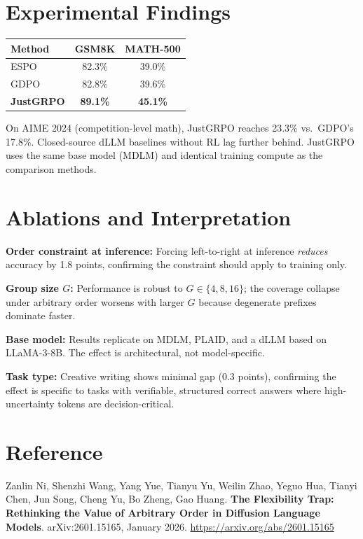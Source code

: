 \documentclass[10pt,twocolumn]{article}
\begin{document}
\section{Experimental Findings}

\begin{center}
\small
\begin{tabular}{lcc}
\toprule
\textbf{Method} & \textbf{GSM8K} & \textbf{MATH-500} \\
\midrule
ESPO   & 82.3\% & 39.0\% \\
GDPO   & 82.8\% & 39.6\% \\
\textbf{JustGRPO} & \textbf{89.1\%} & \textbf{45.1\%} \\
\bottomrule
\end{tabular}
\end{center}

On AIME 2024 (competition-level math), JustGRPO reaches 23.3\%
vs.\ GDPO's 17.8\%. Closed-source dLLM baselines without RL lag further behind.
JustGRPO uses the same base model (MDLM) and identical training compute as the
comparison methods.

\section{Ablations and Interpretation}

\textbf{Order constraint at inference:} Forcing left-to-right at inference
\emph{reduces} accuracy by 1.8 points, confirming the constraint should
apply to training only.

\textbf{Group size $G$:} Performance is robust to $G \in \{4, 8, 16\}$;
the coverage collapse under arbitrary order worsens with larger $G$ because
degenerate prefixes dominate faster.

\textbf{Base model:} Results replicate on MDLM, PLAID, and a dLLM based on
LLaMA-3-8B. The effect is architectural, not model-specific.

\textbf{Task type:} Creative writing shows minimal gap (0.3 points),
confirming the effect is specific to tasks with verifiable, structured
correct answers where high-uncertainty tokens are decision-critical.

\section*{Reference}

Zanlin Ni, Shenzhi Wang, Yang Yue, Tianyu Yu, Weilin Zhao, Yeguo Hua,
Tianyi Chen, Jun Song, Cheng Yu, Bo Zheng, Gao Huang.
\textbf{The Flexibility Trap: Rethinking the Value of Arbitrary Order in
Diffusion Language Models}.
arXiv:2601.15165, January 2026.
\url{https://arxiv.org/abs/2601.15165}
\end{document}
